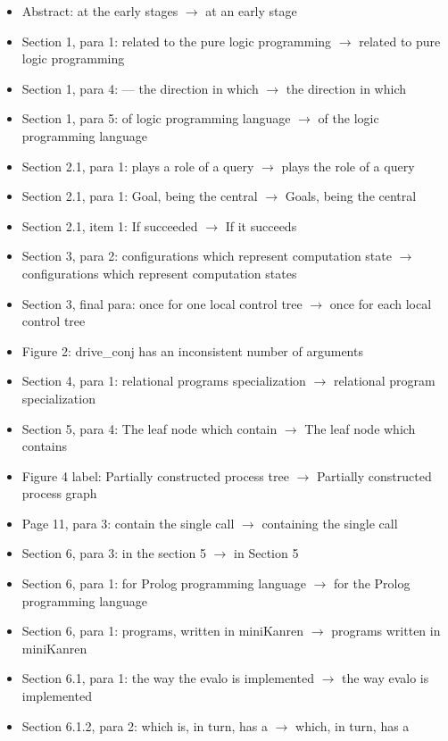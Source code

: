 \begin{itemize}
  \item{Abstract: at the early stages $\rightarrow$ at an early stage}
  \item{Section 1, para 1: related to the pure logic programming $\rightarrow$ related to pure logic programming}
  \item{Section 1, para 4:  — the direction in which $\rightarrow$ the direction in which}
  \item{Section 1, para 5: of logic programming language $\rightarrow$ of the logic programming language}
  \item{Section 2.1, para 1: plays a role of a query $\rightarrow$ plays the role of a query}
  \item{Section 2.1, para 1: Goal, being the central $\rightarrow$ Goals, being the central}
  \item{Section 2.1, item 1: If succeeded $\rightarrow$ If it succeeds}
  \item{Section 3, para 2: configurations which represent computation state $\rightarrow$ configurations which represent computation states}
  \item{Section 3, final para: once for one local control tree $\rightarrow$ once for each local control tree}
  \item{Figure 2: drive_conj has an inconsistent number of arguments}
  \item{Section 4, para 1: relational programs specialization $\rightarrow$ relational program specialization}
  \item{Section 5, para 4: The leaf node which contain $\rightarrow$ The leaf node which contains}
  \item{Figure 4 label: Partially constructed process tree $\rightarrow$ Partially constructed process graph}
  \item{Page 11, para 3: contain the single call $\rightarrow$ containing the single call}
  \item{Section 6, para 3: in the section 5 $\rightarrow$ in Section 5}
  \item{Section 6, para 1: for Prolog programming language $\rightarrow$ for the Prolog programming language}
  \item{Section 6, para 1: programs, written in miniKanren $\rightarrow$ programs written in miniKanren}
  \item{Section 6.1, para 1: the way the evalo is implemented $\rightarrow$ the way evalo is implemented}
  \item{Section 6.1.2, para 2: which is, in turn, has a $\rightarrow$ which, in turn, has a}

\end{itemize}
